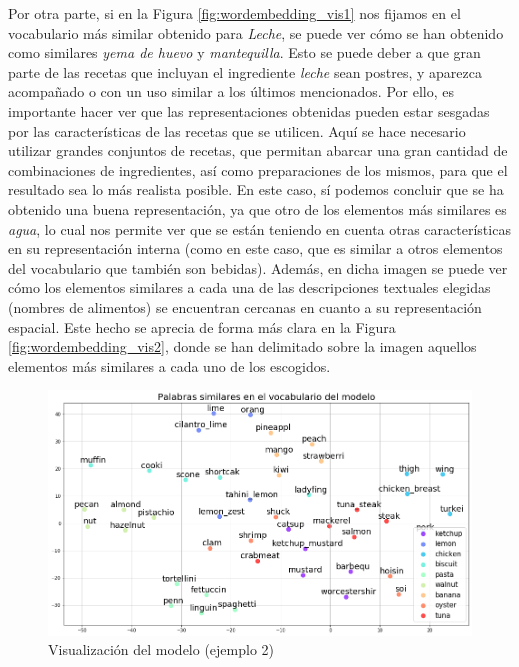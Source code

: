Por otra parte, si en la Figura \ref{fig:wordembedding_vis1} nos fijamos en el vocabulario más similar obtenido para \textit{Leche}, se puede ver cómo se han obtenido como similares \textit{yema de huevo} y \textit{mantequilla}. Esto se puede deber a que gran parte de las recetas que incluyan el ingrediente \textit{leche} sean postres, y aparezca acompañado o con un uso similar a los últimos mencionados. Por ello, es importante hacer ver que las representaciones obtenidas pueden estar sesgadas por las características de las recetas que se utilicen. Aquí se hace necesario utilizar grandes conjuntos de recetas, que permitan abarcar una gran cantidad de combinaciones de ingredientes, así como preparaciones de los mismos, para que el resultado sea lo más realista posible. En este caso, sí podemos concluir que se ha obtenido una buena representación, ya que otro de los elementos más similares es \textit{agua}, lo cual nos permite ver que se están teniendo en cuenta otras características en su representación interna (como en este caso, que es similar a otros elementos del vocabulario que también son bebidas). Además, en dicha imagen se puede ver cómo los elementos similares a cada una de las descripciones textuales elegidas (nombres de alimentos) se encuentran cercanas en cuanto a su representación espacial. Este hecho se aprecia de forma más clara en la Figura \ref{fig:wordembedding_vis2}, donde se han delimitado sobre la imagen aquellos elementos más similares a cada uno de los escogidos.


\begin{figure}[H]
    \centering
    \includegraphics[width=1.0\textwidth]{imagenes/resultados/word-embedding-4.png}
    \caption{Visualización del modelo  (ejemplo 2)}
    \label{fig:wordembedding_vis3}
\end{figure}


